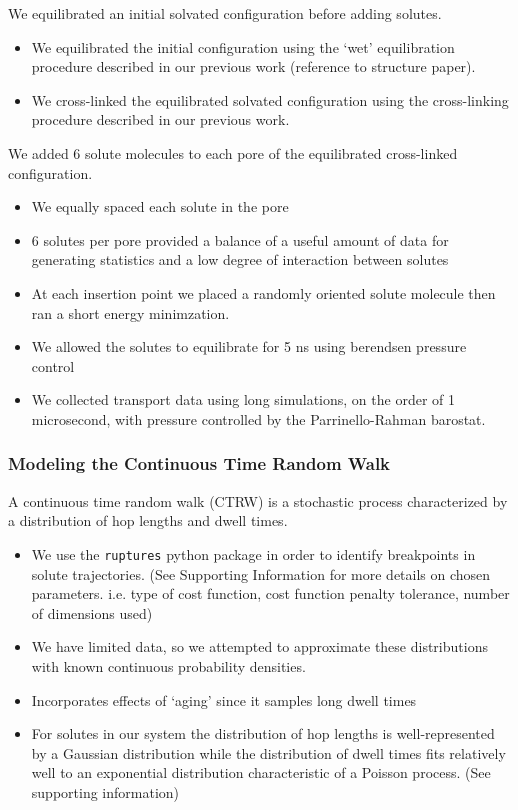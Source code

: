 \documentclass{article}
\begin{document}
  We equilibrated an initial solvated configuration before adding solutes.
  \begin{itemize}
	\item We equilibrated the initial configuration using the `wet'
	equilibration procedure described in our previous work (reference to structure
	paper).
	\item We cross-linked the equilibrated solvated configuration using the
	cross-linking procedure described in our previous work. 
  \end{itemize}

  We added 6 solute molecules to each pore of the equilibrated cross-linked
  configuration.
  \begin{itemize}
	\item We equally spaced each solute in the pore
	\item 6 solutes per pore provided a balance of a useful amount of data
	for generating statistics and a low degree of interaction between solutes
	\item At each insertion point we placed a randomly oriented solute molecule
	then ran a short energy minimzation.
	\item We allowed the solutes to equilibrate for 5 ns using berendsen 
	pressure control
	\item We collected transport data using long simulations, on the order of
	1 microsecond, with pressure controlled by the Parrinello-Rahman barostat.
  \end{itemize}
  
  \subsubsection*{Modeling the Continuous Time Random Walk}\label{method:CTRW}

  A continuous time random walk (CTRW) is a stochastic process characterized by a 
  distribution of hop lengths and dwell times.
  \begin{itemize}
	\item We use the \texttt{ruptures} python package in order to identify
	breakpoints in solute trajectories. (See Supporting Information for more
	details on chosen parameters. i.e. type of cost function, cost function penalty
	tolerance, number of dimensions used)
	\item We have limited data, so we attempted to approximate these distributions
	with known continuous probability densities.
	\item Incorporates effects of `aging' since it samples long dwell times
	\item For solutes in our system the distribution of hop lengths is
	well-represented by a Gaussian distribution while the distribution of dwell
	times fits relatively well to an exponential distribution characteristic of a
	Poisson process. (See supporting information)
  \end{itemize}
\end{document}
